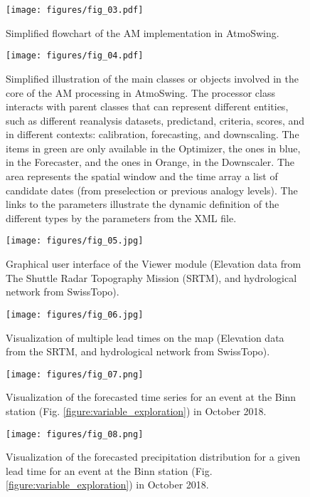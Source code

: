 \documentclass[gmd]{copernicus}
\begin{document}
\begin{figure}[t]
	\texttt{[image: figures/fig\_03.pdf]}
	\caption{Simplified flowchart of the AM implementation in AtmoSwing.}
	\label{figure:flowchart_modules_atmoswing}
\end{figure}

\begin{figure*}[t]
	\texttt{[image: figures/fig\_04.pdf]}
	\caption{Simplified illustration of the main classes or objects involved in the core of the AM processing in AtmoSwing. The processor class interacts with parent classes that can represent different entities, such as different reanalysis datasets, predictand, criteria, scores, and in different contexts: calibration, forecasting, and downscaling. The items in green are only available in the Optimizer, the ones in blue, in the Forecaster, and the ones in Orange, in the Downscaler. The area represents the spatial window and the time array a list of candidate dates (from preselection or previous analogy levels). The links to the parameters illustrate the dynamic definition of the different types by the parameters from the XML file.}
	\label{figure:code_diagram}
\end{figure*}

\begin{figure*}[t]
	\texttt{[image: figures/fig\_05.jpg]}
	\caption{Graphical user interface of the Viewer module (Elevation data from The Shuttle Radar Topography Mission (SRTM), and hydrological network from SwissTopo).}
	\label{figure:atmoswing-viewer-gui}
\end{figure*}

\begin{figure*}[t]
	\texttt{[image: figures/fig\_06.jpg]}
	\caption{Visualization of multiple lead times on the map (Elevation data from the SRTM, and hydrological network from SwissTopo).}
	\label{figure:atmoswing-viewer-snail}
\end{figure*}

\begin{figure}[t]
	\texttt{[image: figures/fig\_07.png]}
	\caption{Visualization of the forecasted time series for an event at the Binn station (Fig. \ref{figure:variable_exploration}) in October 2018.}
	\label{figure:atmoswing-viewer-timeseries}
\end{figure}

\begin{figure}[t]
	\texttt{[image: figures/fig\_08.png]}
	\caption{Visualization of the forecasted precipitation distribution for a given lead time for an event at the Binn station (Fig. \ref{figure:variable_exploration}) in October 2018.}
	\label{figure:atmoswing-viewer-distribution}
\end{figure}
\end{document}
